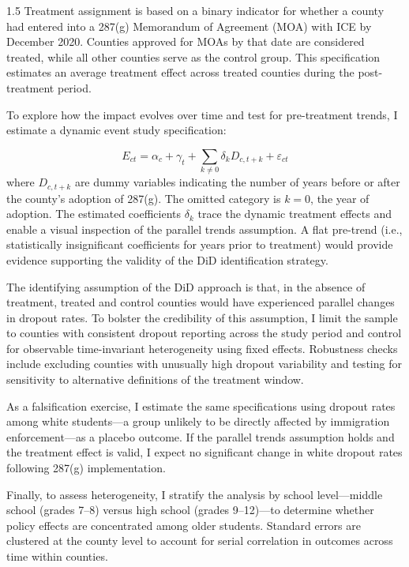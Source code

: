 \documentclass[12pt]{article}
\begin{document}
\begin{spacing}{1.5}
Treatment assignment is based on a binary indicator for whether a county had entered into a 287(g) Memorandum of Agreement (MOA) with ICE by December 2020. Counties approved for MOAs by that date are considered treated, while all other counties serve as the control group. This specification estimates an average treatment effect across treated counties during the post-treatment period.

To explore how the impact evolves over time and test for pre-treatment trends, I estimate a dynamic event study specification:

\begin{equation}
E_{ct} = \alpha_c + \gamma_t + \sum_{k \neq 0} \delta_k D_{c,t+k} + \varepsilon_{ct}
\label{eq:eventstudy}
\end{equation}
where $D_{c,t+k}$ are dummy variables indicating the number of years before or after the county’s adoption of 287(g). The omitted category is $k = 0$, the year of adoption. The estimated coefficients $\delta_k$ trace the dynamic treatment effects and enable a visual inspection of the parallel trends assumption. A flat pre-trend (i.e., statistically insignificant coefficients for years prior to treatment) would provide evidence supporting the validity of the DiD identification strategy.

The identifying assumption of the DiD approach is that, in the absence of treatment, treated and control counties would have experienced parallel changes in dropout rates. To bolster the credibility of this assumption, I limit the sample to counties with consistent dropout reporting across the study period and control for observable time-invariant heterogeneity using fixed effects. Robustness checks include excluding counties with unusually high dropout variability and testing for sensitivity to alternative definitions of the treatment window.

As a falsification exercise, I estimate the same specifications using dropout rates among white students—a group unlikely to be directly affected by immigration enforcement—as a placebo outcome. If the parallel trends assumption holds and the treatment effect is valid, I expect no significant change in white dropout rates following 287(g) implementation.

Finally, to assess heterogeneity, I stratify the analysis by school level—middle school (grades 7–8) versus high school (grades 9–12)—to determine whether policy effects are concentrated among older students. Standard errors are clustered at the county level to account for serial correlation in outcomes across time within counties.


\end{spacing}
\end{document}
